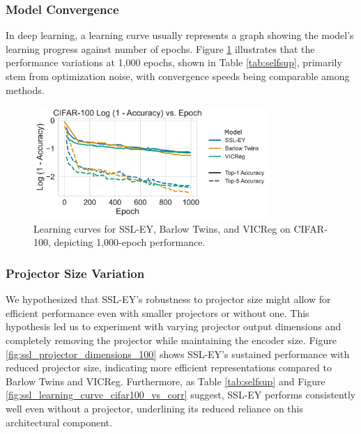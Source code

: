 \subsubsection{Model Convergence} In deep learning, a learning curve usually represents a graph showing the model's learning progress against number of epochs.
Figure \ref{fig:ssl_learning_curve_cifar100_top5} illustrates that the performance variations at 1,000 epochs, shown in Table \ref{tab:selfsup}, primarily stem from optimization noise, with convergence speeds being comparable among methods.

\begin{figure}[H]
    \centering
    \includegraphics[width=0.8\textwidth]{figures/SSL/cifar100_learning_curve_log_error}
    \caption{Learning curves for SSL-EY, Barlow Twins, and VICReg on CIFAR-100, depicting 1,000-epoch performance.}
    \label{fig:ssl_learning_curve_cifar100_top5}
\end{figure}

\subsubsection{Projector Size Variation} We hypothesized that SSL-EY's robustness to projector size might allow for efficient performance even with smaller projectors or without one.
This hypothesis led us to experiment with varying projector output dimensions and completely removing the projector while maintaining the encoder size.
Figure \ref{fig:ssl_projector_dimensions_100} shows SSL-EY's sustained performance with reduced projector size, indicating more efficient representations compared to Barlow Twins and VICReg.
Furthermore, as Table \ref{tab:selfsup} and Figure \ref{fig:ssl_learning_curve_cifar100_vs_corr} suggest, SSL-EY performs consistently well even without a projector, underlining its reduced reliance on this architectural component.

